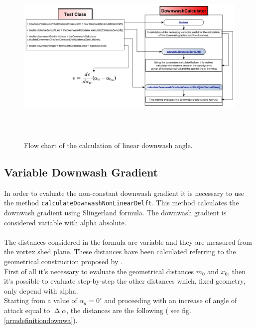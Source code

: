 \begin{figure}[H]
\centering
{\includegraphics[height=8cm, angle=90]{Immagini/linearDownwash_2.pdf}} 
\caption{Flow chart of the calculation of linear downwash angle.}
\label{flowchartangles}
\end{figure} 



\subsection{Variable Downwash Gradient}

In order to evaluate the non-constant downwash gradient it is necessary to use the method \texttt{calculateDownwashNonLinearDelft}. 
This method calculates the downwash gradient using Slingerland formula. The downwash gradient is considered variable with alpha absolute. 
\\ \\
The distances  considered in the formula are variable and they are measured from the vortex shed plane. These distances have been calculated referring to the geometrical construction proposed  by \cite{uninagiordano}.\\
First of all it's necessary to evaluate the geometrical distances $m_0$ and $x_0$, then it's possible to evaluate step-by-step the other distances which, fixed geometry, only depend with alpha.\\ Starting from a value of  $\alpha_a = 0^{\circ}$ and proceeding with an increase of angle of attack equal to $ \upDelta \alpha$, the distances are the following ( see fig. \ref{armdefinitiondownwa}).


